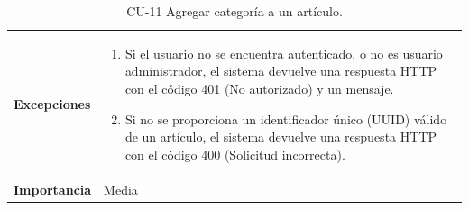 \begin{table}[p]
\begin{tabularx}{\linewidth}{ p{} p{} }
		\textbf{Excepciones}          & 
            \begin{enumerate}
			\def\labelenumi{\arabic{enumi}.}
			\tightlist
   			\item Si el usuario no se encuentra autenticado, o no es usuario administrador, el sistema devuelve una                 respuesta HTTP con el código 401 (No autorizado) y un mensaje.
                \item Si no se proporciona un identificador único (UUID) válido de un artículo, el sistema devuelve una respuesta HTTP con el código 400 (Solicitud incorrecta).
            \end{enumerate}\\
		\textbf{Importancia}          & Media \\
		\bottomrule
	\end{tabularx}
	\caption{CU-11 Agregar categoría a un artículo.}
\end{table}

